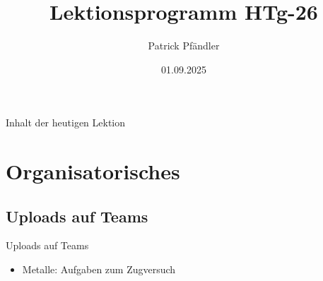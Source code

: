 



\title{\textbf{Lektionsprogramm HTg-26}}
\author{Patrick Pfändler}



\date{01.09.2025}




\frame{\titlepage}





\begin{frame}{Inhalt der heutigen Lektion}
    \tableofcontents
\end{frame}


\section{Organisatorisches}
\BlueSectionSlide

\subsection{Uploads auf Teams}
\begin{frame}{Uploads auf Teams}
    \begin{itemize}
        \item[\textbullet] Metalle: Aufgaben zum Zugversuch
    \end{itemize}

\end{frame}



